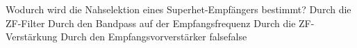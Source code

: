     {Wodurch wird die Nahselektion eines Superhet-Empfängers bestimmt?}
    {Durch die ZF-Filter}
    {Durch den Bandpass auf der Empfangsfrequenz}
    {Durch die ZF-Verstärkung}
    {Durch den Empfangsvorverstärker}
    {false}{false}